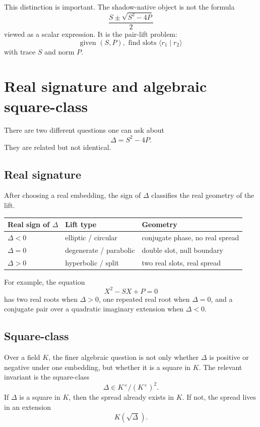 \documentclass[11pt]{article}
\begin{document}
This distinction is important.  The shadow-native object is not the formula
\[
    \frac{S\pm \sqrt{S^2-4P}}{2}
\]
viewed as a scalar expression.  It is the pair-lift problem:
\[
    \text{given }(S,P),\text{ find slots }\langle r_1\mid r_2\rangle
\]
with trace $S$ and norm $P$.

\section{Real signature and algebraic square-class}

There are two different questions one can ask about
\[
    \Delta=S^2-4P.
\]
They are related but not identical.

\subsection{Real signature}

After choosing a real embedding, the sign of $\Delta$ classifies the real geometry of the lift.

\begin{center}
\begin{tabular}{lll}
\toprule
Real sign of $\Delta$ & Lift type & Geometry \\
\midrule
$\Delta<0$ & elliptic / circular & conjugate phase, no real spread \\
$\Delta=0$ & degenerate / parabolic & double slot, null boundary \\
$\Delta>0$ & hyperbolic / split & two real slots, real spread \\
\bottomrule
\end{tabular}
\end{center}

For example, the equation
\[
    X^2-SX+P=0
\]
has two real roots when $\Delta>0$, one repeated real root when $\Delta=0$, and a conjugate pair over a quadratic imaginary extension when $\Delta<0$.

\subsection{Square-class}

Over a field $K$, the finer algebraic question is not only whether $\Delta$ is positive or negative under one embedding, but whether it is a square in $K$.  The relevant invariant is the square-class
\[
    \Delta\in K^\times/(K^\times)^2.
\]
If $\Delta$ is a square in $K$, then the spread already exists in $K$.  If not, the spread lives in an extension
\[
    K(\sqrt{\Delta}).
\]
\end{document}
